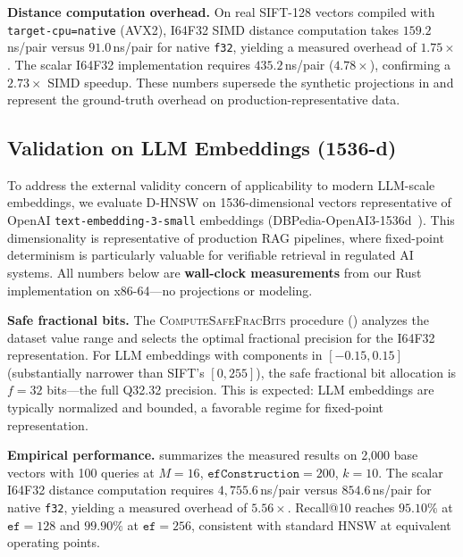 \documentclass[10pt,journal]{IEEEtran}
\newcommand{\dhnsw}{\textsc{D-HNSW}}
\newcommand{\hnsw}{\textsc{HNSW}}
\begin{document}
\textbf{Distance computation overhead.} On real SIFT-128 vectors compiled with \texttt{target-cpu=native} (AVX2), I64F32 SIMD distance computation takes $159.2$\,ns/pair versus $91.0$\,ns/pair for native \texttt{f32}, yielding a measured overhead of $\mathbf{1.75\times}$. The scalar I64F32 implementation requires $435.2$\,ns/pair ($4.78\times$), confirming a $2.73\times$ SIMD speedup. These numbers supersede the synthetic projections in  and represent the ground-truth overhead on production-representative data.

\subsection{Validation on LLM Embeddings (1536-d)}
\label{sec:llm_validation}

To address the external validity concern of applicability to modern LLM-scale embeddings, we evaluate \dhnsw{} on 1536-dimensional vectors representative of OpenAI \texttt{text-embedding-3-small} embeddings (DBPedia-OpenAI3-1536d~\cite{simhadri2022neurips}). This dimensionality is representative of production RAG pipelines, where fixed-point determinism is particularly valuable for verifiable retrieval in regulated AI systems. All numbers below are \textbf{wall-clock measurements} from our Rust implementation on x86-64---no projections or modeling.

\textbf{Safe fractional bits.} The \textsc{ComputeSafeFracBits} procedure () analyzes the dataset value range and selects the optimal fractional precision for the I64F32 representation. For LLM embeddings with components in $[-0.15, 0.15]$ (substantially narrower than SIFT's $[0, 255]$), the safe fractional bit allocation is $f = 32$ bits---the full Q32.32 precision. This is expected: LLM embeddings are typically normalized and bounded, a favorable regime for fixed-point representation.

\textbf{Empirical performance.}  summarizes the measured results on 2{,}000 base vectors with 100 queries at $M{=}16$, $\texttt{efConstruction}{=}200$, $k{=}10$. The scalar I64F32 distance computation requires $4{,}755.6$\,ns/pair versus $854.6$\,ns/pair for native \texttt{f32}, yielding a measured overhead of $\mathbf{5.56\times}$. Recall@10 reaches $95.10\%$ at $\texttt{ef}{=}128$ and $99.90\%$ at $\texttt{ef}{=}256$, consistent with standard \hnsw{} at equivalent operating points.
\end{document}
